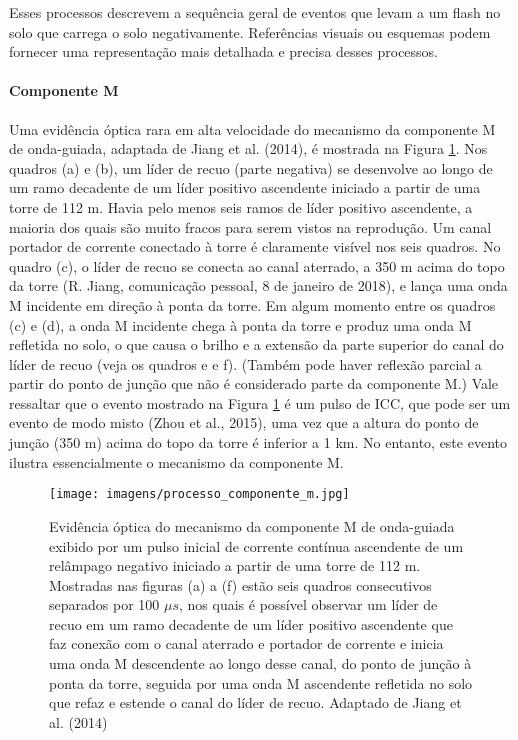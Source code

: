 \documentclass[a4paper, 12pt, onecolumn,singlespacing]{article}
\begin{document}
	Esses processos descrevem a sequência geral de eventos que levam a um flash no solo que carrega o solo negativamente. Referências visuais ou esquemas podem fornecer uma representação mais detalhada e precisa desses processos.
	
	\paragraph{Componente M} Uma evidência óptica rara em alta velocidade do mecanismo da componente M de onda-guiada, adaptada de Jiang et al. (2014), é mostrada na Figura \ref{Component_M_explained}\cite{TRAN_2019}. Nos quadros (a) e (b), um líder de recuo (parte negativa) se desenvolve ao longo de um ramo decadente de um líder positivo ascendente iniciado a partir de uma torre de 112 m. Havia pelo menos seis ramos de líder positivo ascendente, a maioria dos quais são muito fracos para serem vistos na reprodução. Um canal portador de corrente conectado à torre é claramente visível nos seis quadros. No quadro (c), o líder de recuo se conecta ao canal aterrado, a 350 m acima do topo da torre (R. Jiang, comunicação pessoal, 8 de janeiro de 2018), e lança uma onda M incidente em direção à ponta da torre. Em algum momento entre os quadros (c) e (d), a onda M incidente chega à ponta da torre e produz uma onda M refletida no solo, o que causa o brilho e a extensão da parte superior do canal do líder de recuo (veja os quadros e e f). (Também pode haver reflexão parcial a partir do ponto de junção que não é considerado parte da componente M.) Vale ressaltar que o evento mostrado na Figura \ref{Component_M_explained} é um pulso de ICC, que pode ser um evento de modo misto (Zhou et al., 2015), uma vez que a altura do ponto de junção (350 m) acima do topo da torre é inferior a 1 km. No entanto, este evento ilustra essencialmente o mecanismo da componente M.
	
	\begin{figure}[!h]
		\centering
		\texttt{[image: imagens/processo\_componente\_m.jpg]}
		\caption{Evidência óptica do mecanismo da componente M de onda-guiada exibido por um pulso inicial de corrente contínua ascendente de um relâmpago negativo iniciado a partir de uma torre de 112 m. Mostradas nas figuras (a) a (f) estão seis quadros consecutivos separados por 100 $\mu s$, nos quais é possível observar um líder de recuo em um ramo decadente de um líder positivo ascendente que faz conexão com o canal aterrado e portador de corrente e inicia uma onda M descendente ao longo desse canal, do ponto de junção à ponta da torre, seguida por uma onda M ascendente refletida no solo que refaz e estende o canal do líder de recuo. Adaptado de Jiang et al. (2014)}
		\label{Component_M_explained}
	\end{figure}
	
\end{document}
